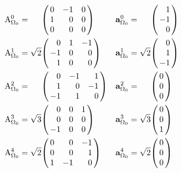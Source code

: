 \documentclass{scrartcl}
\newenvironment{Matrix}[1]{\left(\mspace{-6mu}\begin{array}{*{#1}{r}}}{\end{array}\mspace{-6mu}\right)}
\newenvironment{Matrix3}{\begin{Matrix}3}{\end{Matrix}}
\newenvironment{Vector}{\begin{Matrix}1}{\end{Matrix}}
\newcommand\psqrt{\phantom{\sqrt0}}
\begin{document}
\begin{align}
  \mathrm A_{\Omega_0}^0&=\psqrt\begin{Matrix3}
     0 & -1 &  0 \\
     1 &  0 &  0 \\
     0 &  0 &  0
  \end{Matrix3} & 
  \mathbf a_{\Omega_0}^0&=\psqrt\begin{Vector}  1 \\ -1 \\  0 \end{Vector}
\\
  \mathrm A_{\Omega_0}^1&=\sqrt2\begin{Matrix3}
     0 &  1 & -1 \\
    -1 &  0 &  0 \\
     1 &  0 &  0
  \end{Matrix3} & 
  \mathbf a_{\Omega_0}^1&=\sqrt2\begin{Vector}  0 \\  1 \\ -1 \end{Vector}
\\
  \mathrm A_{\Omega_0}^2&=\psqrt\begin{Matrix3}
     0 & -1 &  1 \\
     1 &  0 & -1 \\
    -1 &  1 &  0
  \end{Matrix3} & 
  \mathbf a_{\Omega_0}^2&=\psqrt\begin{Vector}  0 \\  0 \\  0 \end{Vector}
\\
  \mathrm A_{\Omega_0}^3&=\sqrt3\begin{Matrix3}
     0 &  0 &  1 \\
     0 &  0 &  0 \\
    -1 &  0 &  0
  \end{Matrix3} & 
  \mathbf a_{\Omega_0}^3&=\sqrt3\begin{Vector}  0 \\  0 \\  1 \end{Vector}
\\
  \mathrm A_{\Omega_0}^4&=\sqrt2\begin{Matrix3}
     0 &  0 & -1 \\
     0 &  0 &  1 \\
     1 & -1 &  0
  \end{Matrix3} & 
  \mathbf a_{\Omega_0}^4&=\sqrt2\begin{Vector}  0 \\  0 \\  0 \end{Vector}

\end{align}
\end{document}
